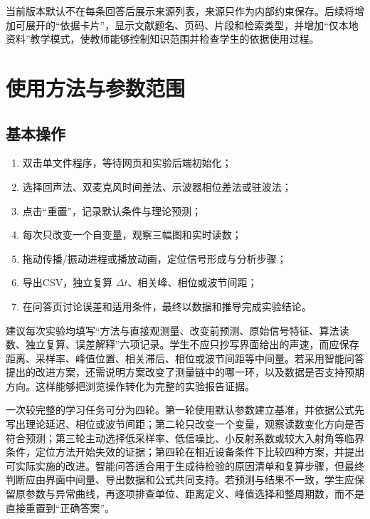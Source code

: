 \documentclass[UTF8,a4paper,zihao=-4]{ctexart}
\begin{document}
当前版本默认不在每条回答后展示来源列表，来源只作为内部约束保存。后续将增加可展开的“依据卡片”，显示文献题名、页码、片段和检索类型，并增加“仅本地资料”教学模式，使教师能够控制知识范围并检查学生的依据使用过程。

\section{使用方法与参数范围}

\subsection{基本操作}
\begin{enumerate}
  \item 双击单文件程序，等待网页和实验后端初始化；
  \item 选择回声法、双麦克风时间差法、示波器相位差法或驻波法；
  \item 点击“重置”，记录默认条件与理论预测；
  \item 每次只改变一个自变量，观察三幅图和实时读数；
  \item 拖动传播/振动进程或播放动画，定位信号形成与分析步骤；
  \item 导出CSV，独立复算 $\Delta t$、相关峰、相位或波节间距；
  \item 在问答页讨论误差和适用条件，最终以数据和推导完成实验结论。
\end{enumerate}

建议每次实验均填写“方法与直接观测量、改变前预测、原始信号特征、算法读数、独立复算、误差解释”六项记录。学生不应只抄写界面给出的声速，而应保存距离、采样率、峰值位置、相关滞后、相位或波节间距等中间量。若采用智能问答提出的改进方案，还需说明方案改变了测量链中的哪一环，以及数据是否支持预期方向。这样能够把浏览操作转化为完整的实验报告证据。

一次较完整的学习任务可分为四轮。第一轮使用默认参数建立基准，并依据公式先写出理论延迟、相位或波节间距；第二轮只改变一个变量，观察读数变化方向是否符合预测；第三轮主动选择低采样率、低信噪比、小反射系数或较大入射角等临界条件，定位方法开始失效的证据；第四轮在相近设备条件下比较四种方案，并提出可实际实施的改进。智能问答适合用于生成待检验的原因清单和复算步骤，但最终判断应由界面中间量、导出数据和公式共同支持。若预测与结果不一致，学生应保留原参数与异常曲线，再逐项排查单位、距离定义、峰值选择和整周期数，而不是直接重置到“正确答案”。
\end{document}
